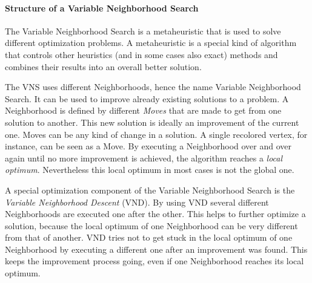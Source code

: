 \documentclass[paper=a4,fontsize=12pt]{scrartcl}
\begin{document}
\paragraph{Structure of a Variable Neighborhood Search}{
The Variable Neighborhood Search is a metaheuristic that is used to solve different optimization problems. A metaheuristic is a special kind of algorithm that controls other heuristics (and in some cases also exact) methods and combines their results into an overall better solution.


The VNS uses different Neighborhoods, hence the name Variable Neighborhood Search. It can be used to improve already existing solutions to a problem. A Neighborhood is defined by different \emph{Moves} that are made to get from one solution to another. This new solution is ideally an improvement of the current one. Moves can be any kind of change in a solution. A single recolored vertex, for instance, can be seen as a Move. By executing a Neighborhood over and over again until no more improvement is achieved, the algorithm reaches a \emph{local optimum}. Nevertheless this local optimum in most cases is not the global one.


A special optimization component of the Variable Neighborhood Search is the \emph{Variable Neighborhood Descent} (VND). By using VND several different Neighborhoods are executed one after the other. This helps to further optimize a solution, because the local optimum of one Neighborhood can be very different from that of another. VND tries not to get stuck in the local optimum of one Neighborhood by executing a different one after an improvement was found. This keeps the improvement process going, even if one Neighborhood reaches its local optimum. 

}
\end{document}
